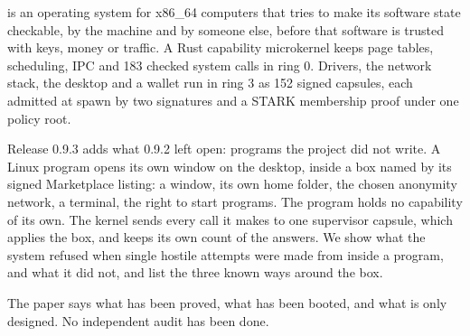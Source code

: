 \noindent\nonos{} is an operating system for x86\_64 computers that tries to make its software state checkable, by the machine and by someone else, before that software is trusted with keys, money or traffic. A Rust capability microkernel keeps page tables, scheduling, IPC and 183 checked system calls in ring 0. Drivers, the network stack, the desktop and a wallet run in ring 3 as 152 signed capsules, each admitted at spawn by two signatures and a STARK membership proof under one policy root.

Release 0.9.3 adds what 0.9.2 left open: programs the project did not write. A Linux program opens its own window on the desktop, inside a box named by its signed Marketplace listing: a window, its own home folder, the chosen anonymity network, a terminal, the right to start programs. The program holds no capability of its own. The kernel sends every call it makes to one supervisor capsule, which applies the box, and keeps its own count of the answers. We show what the system refused when single hostile attempts were made from inside a program, and what it did not, and list the three known ways around the box.

The paper says what has been proved, what has been booted, and what is only designed. No independent audit has been done.
